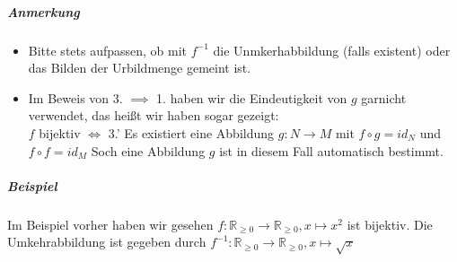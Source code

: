 \documentclass[a4paper]{scrartcl}
\theoremstyle{definition}
\theoremstyle{plain}
\theoremstyle{plain}
\theoremstyle{remark}
\theoremstyle{remark}
\theoremstyle{remark}
\theoremstyle{remark}
\theoremstyle{remark}
\begin{document}
\subparagraph{Anmerkung}
\label{sec-2-6-7-6-2}
\begin{itemize}
\item Bitte stets aufpassen, ob mit $f^{-1}$ die Unmkerhabbildung (falls existent) oder das Bilden der Urbildmenge gemeint ist.
\item Im Beweis von 3. $\implies$ 1. haben wir die Eindeutigkeit von $g$ garnicht verwendet, das heißt wir haben sogar gezeigt: \\
        $f$ bijektiv $\iff$ 3.' Es existiert eine Abbildung $g:N\to M$ mit $f\circ g = id_N$ und $f\circ f = id_M$ Soch eine Abbildung $g$ ist in diesem Fall automatisch bestimmt.
\end{itemize}
\subparagraph{Beispiel}
\label{sec-2-6-7-6-3}
Im Beispiel vorher haben wir gesehen $f:\mathbb{R}_{\geq 0} \to \mathbb{R}_{\geq 0}, x\mapsto x^2$ ist bijektiv.
Die Umkehrabbildung ist gegeben durch $f^{-1}:\mathbb{R}_{\geq 0} \to \mathbb{R}_{\geq 0}, x\mapsto \sqrt{x}$
\end{document}

